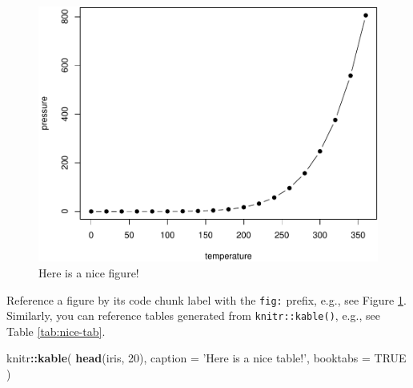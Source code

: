 \documentclass[
]{book}
\newenvironment{Shaded}{\begin{snugshade}}{\end{snugshade}}
\newcommand{\DataTypeTok}[1]{\textcolor[rgb]{0.13,0.29,0.53}{#1}}
\newcommand{\DecValTok}[1]{\textcolor[rgb]{0.00,0.00,0.81}{#1}}
\newcommand{\KeywordTok}[1]{\textcolor[rgb]{0.13,0.29,0.53}{\textbf{#1}}}
\newcommand{\NormalTok}[1]{#1}
\newcommand{\OperatorTok}[1]{\textcolor[rgb]{0.81,0.36,0.00}{\textbf{#1}}}
\newcommand{\OtherTok}[1]{\textcolor[rgb]{0.56,0.35,0.01}{#1}}
\newcommand{\StringTok}[1]{\textcolor[rgb]{0.31,0.60,0.02}{#1}}
\begin{document}
\begin{figure}

{\centering \includegraphics[width=0.8\linewidth]{Lineamientos-Visualizar_files/figure-latex/nice-fig-1} 

}

\caption{Here is a nice figure!}\label{fig:nice-fig}
\end{figure}

Reference a figure by its code chunk label with the \texttt{fig:} prefix, e.g., see Figure \ref{fig:nice-fig}. Similarly, you can reference tables generated from \texttt{knitr::kable()}, e.g., see Table \ref{tab:nice-tab}.

\begin{Shaded}
\begin{Highlighting}[]
\NormalTok{knitr}\OperatorTok{::}\KeywordTok{kable}\NormalTok{(}
  \KeywordTok{head}\NormalTok{(iris, }\DecValTok{20}\NormalTok{), }\DataTypeTok{caption =} \StringTok{'Here is a nice table!'}\NormalTok{,}
  \DataTypeTok{booktabs =} \OtherTok{TRUE}
\NormalTok{)}
\end{Highlighting}
\end{Shaded}
\end{document}
